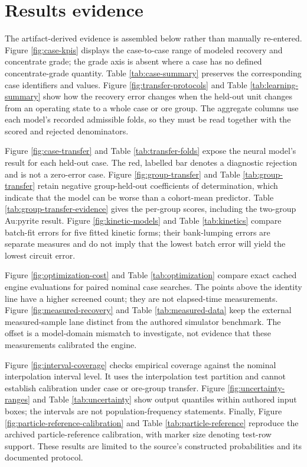 \documentclass[10pt]{article}
\begin{document}
\section{Results evidence}\label{results-evidence}

The artifact-derived evidence is assembled below rather than manually
re-entered. Figure \ref{fig:case-kpis} displays the case-to-case range
of modeled recovery and concentrate grade; the grade axis is absent
where a case has no defined concentrate-grade quantity. Table
\ref{tab:case-summary} preserves the corresponding case identifiers and
values. Figure \ref{fig:transfer-protocols} and Table
\ref{tab:learning-summary} show how the recovery error changes when the
held-out unit changes from an operating state to a whole case or ore
group. The aggregate columns use each model's recorded admissible folds,
so they must be read together with the scored and rejected denominators.

Figure \ref{fig:case-transfer} and Table \ref{tab:transfer-folds} expose
the neural model's result for each held-out case. The red, labelled bar
denotes a diagnostic rejection and is not a zero-error case. Figure
\ref{fig:group-transfer} and Table \ref{tab:group-transfer} retain
negative group-held-out coefficients of determination, which indicate
that the model can be worse than a cohort-mean predictor. Table
\ref{tab:group-transfer-evidence} gives the per-group scores, including
the two-group Au:pyrite result. Figure
\ref{fig:kinetic-models} and Table \ref{tab:kinetics} compare batch-fit
errors for five fitted kinetic forms; their bank-lumping errors are
separate measures and do not imply that the lowest batch error will
yield the lowest circuit error.

Figure \ref{fig:optimization-cost} and Table \ref{tab:optimization}
compare exact cached engine evaluations for paired nominal case
searches. The points above the identity line have a higher screened
count; they are not elapsed-time measurements. Figure
\ref{fig:measured-recovery} and Table \ref{tab:measured-data} keep the
external measured-sample lane distinct from the authored simulator
benchmark. The offset is a model-domain mismatch to investigate, not
evidence that these measurements calibrated the engine.

Figure \ref{fig:interval-coverage} checks empirical coverage against the
nominal interpolation interval level. It uses the interpolation test
partition and cannot establish calibration under case or ore-group
transfer. Figure \ref{fig:uncertainty-ranges} and Table
\ref{tab:uncertainty} show output quantiles within authored input boxes;
the intervals are not population-frequency statements. Finally, Figure
\ref{fig:particle-reference-calibration} and Table
\ref{tab:particle-reference} reproduce the archived particle-reference
calibration, with marker size denoting test-row support. These results
are limited to the source's constructed probabilities and its documented
protocol.
\end{document}
